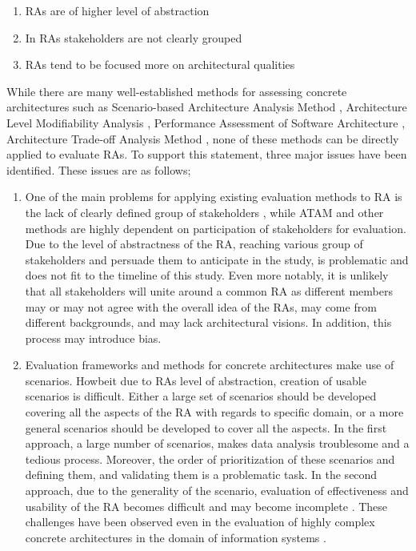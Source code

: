 \documentclass[review]{elsarticle}
\begin{document}
\begin{enumerate}
    \item RAs are of higher level of abstraction
    \item In RAs stakeholders are not clearly grouped
    \item RAs tend to be focused more on architectural qualities
\end{enumerate}

While there are many well-established methods for assessing concrete architectures such as Scenario-based Architecture Analysis Method \cite{kazman1994saam}, Architecture Level Modifiability Analysis \cite{Bengtsson}, Performance Assessment of Software Architecture \cite{Williams}, Architecture Trade-off Analysis Method \cite{KazmanATAM}, none of these methods can be directly applied to evaluate RAs. To support this statement, three major issues have been identified. These issues are as follows;

\begin{enumerate}
    \item One of the main problems for applying existing evaluation methods to RA is the lack of clearly defined group of stakeholders \cite{angelov2008towards}, while ATAM and other methods are highly dependent on participation of stakeholders for evaluation. Due to the level of abstractness of the RA, reaching various group of stakeholders and persuade them to anticipate in the study, is problematic and does not fit to the timeline of this study. Even more notably, it is unlikely that all stakeholders will unite around a common RA as different members may or may not agree with the overall idea of the RAs, may come from different backgrounds, and may lack architectural visions. In addition, this process may introduce bias.
    \item Evaluation frameworks and methods for concrete architectures make use of scenarios. Howbeit due to RAs level of abstraction, creation of usable scenarios is difficult. Either a large set of scenarios should be developed covering all the aspects of the RA with regards to specific domain, or a more general scenarios should be developed to cover all the aspects. In the first approach, a large number of scenarios, makes data analysis troublesome and a tedious process. Moreover, the order of prioritization of these scenarios and defining them, and validating them is a problematic task. In the second approach, due to the generality of the scenario, evaluation of effectiveness and usability of the RA becomes difficult and may become incomplete \cite{Avgeriou}. These challenges have been observed even in the evaluation of highly complex concrete architectures in the domain of information systems \cite{bengtsson1998scenario}.
\end{enumerate}
\end{document}
